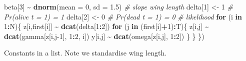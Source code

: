 \documentclass[
  12pt,
]{krantz}
\newenvironment{Shaded}{\begin{snugshade}}{\end{snugshade}}
\newcommand{\AttributeTok}[1]{\textcolor[rgb]{0.13,0.29,0.53}{#1}}
\newcommand{\CommentTok}[1]{\textcolor[rgb]{0.56,0.35,0.01}{\textit{#1}}}
\newcommand{\ControlFlowTok}[1]{\textcolor[rgb]{0.13,0.29,0.53}{\textbf{#1}}}
\newcommand{\DecValTok}[1]{\textcolor[rgb]{0.00,0.00,0.81}{#1}}
\newcommand{\FloatTok}[1]{\textcolor[rgb]{0.00,0.00,0.81}{#1}}
\newcommand{\FunctionTok}[1]{\textcolor[rgb]{0.13,0.29,0.53}{\textbf{#1}}}
\newcommand{\NormalTok}[1]{#1}
\newcommand{\OtherTok}[1]{\textcolor[rgb]{0.56,0.35,0.01}{#1}}
\newcommand{\SpecialCharTok}[1]{\textcolor[rgb]{0.81,0.36,0.00}{\textbf{#1}}}
\newcommand{\StringTok}[1]{\textcolor[rgb]{0.31,0.60,0.02}{#1}}
\begin{document}
\begin{Shaded}
\begin{Highlighting}[]
\NormalTok{  beta[}\DecValTok{3}\NormalTok{] }\SpecialCharTok{\textasciitilde{}} \FunctionTok{dnorm}\NormalTok{(}\AttributeTok{mean =} \DecValTok{0}\NormalTok{, }\AttributeTok{sd =} \FloatTok{1.5}\NormalTok{) }\CommentTok{\# slope wing length}
\NormalTok{  delta[}\DecValTok{1}\NormalTok{] }\OtherTok{\textless{}{-}} \DecValTok{1}          \CommentTok{\# Pr(alive t = 1) = 1}
\NormalTok{  delta[}\DecValTok{2}\NormalTok{] }\OtherTok{\textless{}{-}} \DecValTok{0}          \CommentTok{\# Pr(dead t = 1) = 0}
  \CommentTok{\# likelihood}
  \ControlFlowTok{for}\NormalTok{ (i }\ControlFlowTok{in} \DecValTok{1}\SpecialCharTok{:}\NormalTok{N)\{}
\NormalTok{    z[i,first[i]] }\SpecialCharTok{\textasciitilde{}} \FunctionTok{dcat}\NormalTok{(delta[}\DecValTok{1}\SpecialCharTok{:}\DecValTok{2}\NormalTok{])}
    \ControlFlowTok{for}\NormalTok{ (j }\ControlFlowTok{in}\NormalTok{ (first[i]}\SpecialCharTok{+}\DecValTok{1}\NormalTok{)}\SpecialCharTok{:}\NormalTok{T)\{}
\NormalTok{      z[i,j] }\SpecialCharTok{\textasciitilde{}} \FunctionTok{dcat}\NormalTok{(gamma[z[i,j}\DecValTok{{-}1}\NormalTok{], }\DecValTok{1}\SpecialCharTok{:}\DecValTok{2}\NormalTok{, i])}
\NormalTok{      y[i,j] }\SpecialCharTok{\textasciitilde{}} \FunctionTok{dcat}\NormalTok{(omega[z[i,j], }\DecValTok{1}\SpecialCharTok{:}\DecValTok{2}\NormalTok{])}
\NormalTok{    \}}
\NormalTok{  \}}
\NormalTok{\})}
\end{Highlighting}
\end{Shaded}

Constants in a list. Note we standardise wing length.

\begin{Shaded}
\end{Shaded}
\end{document}
